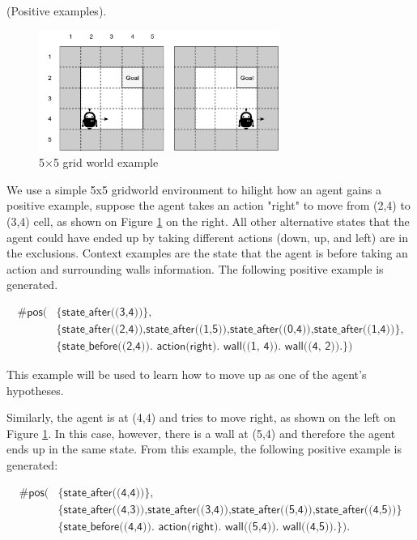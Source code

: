 \begin{examp} \normalfont (Positive examples).

\begin{figure}[!htb]
\centering
\includegraphics[width=0.7\textwidth]{./figures/pipeline_example1}
\caption{5$\times$5 grid world example}
\label{example_pos_example}
\end{figure}

We use a simple 5x5 gridworld environment to hilight how an agent gains a positive example, suppose the agent takes an action "right" to move from (2,4) to (3,4) cell, as shown on Figure \ref{example_pos_example} on the right.
All other alternative states that the agent could have ended up by taking different actions
(down, up, and left) are in the exclusions.
Context examples are the state that the agent is before taking an action and surrounding walls information. The following positive example is generated.

\begin{equation}
\begin{split}
    \textsf{\#pos(} & \textsf{\{state\_after((3,4))\},}\\
                    & \textsf{\{state\_after((2,4)),state\_after((1,5)),state\_after((0,4)),state\_after((1,4))\},} \\
    & \textsf{\{state\_before((2,4)). action(right). wall((1, 4)). wall((4, 2)).\})}
\end{split}
\end{equation}

This example will be used to learn how to move up as one of the agent's hypotheses.

Similarly, the agent is at (4,4) and tries to move right, as shown on the left on Figure \ref{example_pos_example}. In this case, however, there is a wall at (5,4) and therefore the agent ends up in the same state. From this example, the following positive example is generated:

\begin{equation}
\begin{split}
\textsf{\#pos(} & \textsf{\{state\_after((4,4))\}}, \\
                & \textsf{\{state\_after((4,3)),state\_after((3,4)),state\_after((5,4)),state\_after((4,5))\}} \\
                & \textsf{\{state\_before((4,4)). action(right). wall((5,4)). wall((4,5)).\}).}
\end{split}
\end{equation}

\end{examp}
